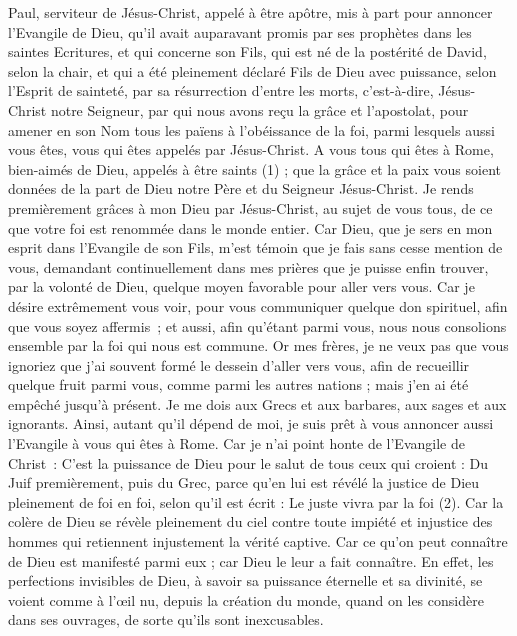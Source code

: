 \BFont
\begin{multicols}{2}
\VerseOne{}Paul, serviteur de Jésus-Christ, appelé à être apôtre, mis à part pour annoncer l'Evangile de Dieu,
qu’il avait auparavant promis par ses prophètes dans les saintes Ecritures,
et qui concerne son Fils, qui est né de la postérité de David, selon la chair,
et qui a été pleinement déclaré Fils de Dieu avec puissance, selon l'Esprit de sainteté, par sa résurrection d'entre les morts, c'est-à-dire, Jésus-Christ notre Seigneur,
par qui nous avons reçu la grâce et l’apostolat, pour amener en son Nom tous les païens à l’obéissance de la foi,
parmi lesquels aussi vous êtes, vous qui êtes appelés par Jésus-Christ.
A vous tous qui êtes à Rome, bien-aimés de Dieu, appelés à être saints (1) ; que la grâce et la paix vous soient données de la part de Dieu notre Père et du Seigneur Jésus-Christ.
Je rends premièrement grâces à mon Dieu par Jésus-Christ, au sujet de vous tous, de ce que votre foi est renommée dans le monde entier.
Car Dieu, que je sers en mon esprit dans l'Evangile de son Fils, m'est témoin que je fais sans cesse mention de vous,
demandant continuellement dans mes prières que je puisse enfin trouver, par la volonté de Dieu, quelque moyen favorable pour aller vers vous.
Car je désire extrêmement vous voir, pour vous communiquer quelque don spirituel, afin que vous soyez affermis ;
et aussi, afin qu'étant parmi vous, nous nous consolions ensemble par la foi qui nous est commune.
Or mes frères, je ne veux pas que vous ignoriez que j’ai souvent formé le dessein d'aller vers vous, afin de recueillir quelque fruit parmi vous, comme parmi les autres nations ; mais j'en ai été empêché jusqu'à présent.
Je me dois aux Grecs et aux barbares, aux sages et aux ignorants.
Ainsi, autant qu’il dépend de moi, je suis prêt à vous annoncer aussi l'Evangile à vous qui êtes à Rome.
Car je n'ai point honte de l'Evangile de Christ : C’est la puissance de Dieu pour le salut de tous ceux qui croient : Du Juif premièrement, puis du Grec,
parce qu’en lui est révélé la justice de Dieu pleinement de foi en foi, selon qu'il est écrit : Le juste vivra par la foi (2).
Car la colère de Dieu se révèle pleinement du ciel contre toute impiété et injustice des hommes qui retiennent injustement la vérité captive.
Car ce qu’on peut connaître de Dieu est manifesté parmi eux ; car Dieu le leur a fait connaître.
En effet, les perfections invisibles de Dieu, à savoir sa puissance éternelle et sa divinité, se voient comme à l’œil nu, depuis la création du monde, quand on les considère dans ses ouvrages, de sorte qu'ils sont inexcusables.

\end{multicols}
